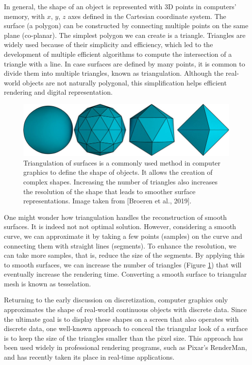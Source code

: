 In general, the shape of an object is represented with 3D points in computers' memory, with $x$, $y$, $z$ axes defined in the Cartesian coordinate system. The surface (a polygon) can be constructed by connecting multiple points on the same plane (co-planar). The simplest polygon we can create is a triangle. Triangles are widely used because of their simplicity and efficiency, which led to the development of multiple efficient algorithms to compute the intersection of a triangle with a line. In case surfaces are defined by many points, it is common to divide them into multiple triangles, known as triangulation. Although the real-world objects are not naturally polygonal, this simplification helps efficient rendering and digital representation.

\begin{figure}
  \centering
   \includegraphics[width=\linewidth]{Images/Triangulation-of-surfaces-Any-curved-surface-in-this-case-a-sphere-can-be-approximated.png}
   \caption{Triangulation of surfaces is a commonly used method in computer graphics to define the shape of objects. It allows the creation of complex shapes. Increasing the number of triangles also increases the resolution of the shape that leads to smoother surface representations. Image taken from [Broeren et al., 2019].}
   \label{fig:triangulation}
\end{figure}

One might wonder how triangulation handles the reconstruction of smooth surfaces. It is indeed not not optimal solution. However, considering a smooth curve, we can approximate it by taking a few points (samples) on the curve and connecting them with straight lines (segments). To enhance the resolution, we can take more samples, that is, reduce the size of the segments. By applying this to smooth surfaces, we can increase the number of triangles (Figure \ref{fig:triangulation}) that will eventually increase the rendering time. Converting a smooth surface to triangular mesh is known as tesselation.

Returning to the early discussion on discretization, computer graphics only approximates the shape of real-world continuous objects with discrete data. Since the ultimate goal is to display these shapes on a screen that also operates with discrete data, one well-known approach to conceal the triangular look of a surface is to keep the size of the triangles smaller than the pixel size. This approach has been used widely in professional rendering programs, such as Pixar's RenderMan, and has recently taken its place in real-time applications.

